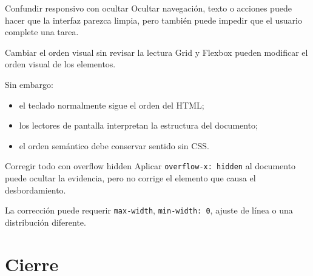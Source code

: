 \documentclass[aspectratio=169,11pt]{beamer}
\begin{document}
    \begin{frame}{Confundir responsivo con ocultar}
        Ocultar navegación, texto o acciones puede hacer que la interfaz parezca limpia,
        pero también puede impedir que el usuario complete una tarea.

    \end{frame}

    \begin{frame}{Cambiar el orden visual sin revisar la lectura}
        Grid y Flexbox pueden modificar el orden visual de los elementos.

        Sin embargo:

        \begin{itemize}
            \item el teclado normalmente sigue el orden del HTML;
            \item los lectores de pantalla interpretan la estructura del documento;
            \item el orden semántico debe conservar sentido sin CSS.
        \end{itemize}

    \end{frame}

    \begin{frame}{Corregir todo con overflow hidden}
        Aplicar \texttt{overflow-x: hidden} al documento puede ocultar la evidencia,
        pero no corrige el elemento que causa el desbordamiento.


        La corrección puede requerir \texttt{max-width}, \texttt{min-width: 0},
        ajuste de línea o una distribución diferente.
    \end{frame}

    \section{Cierre}
\end{document}
